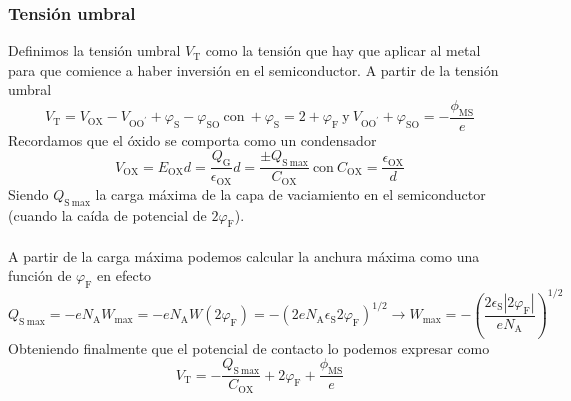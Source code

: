 \subsubsection{Tensión umbral}
Definimos la tensión umbral $V_\mathrm{T}$ como la tensión que hay que aplicar al metal para que comience a haber inversión en el semiconductor. A partir de la tensión umbral 
\begin{equation}
    V_\mathrm{T}=V_\mathrm{OX}-V_\mathrm{OO^\prime} +\varphi_\mathrm{S}-\varphi_\mathrm{SO}  \ \text{con} \ +\varphi_\mathrm{S}=2+\varphi_\mathrm{F}  \ \text{y} \ V_\mathrm{OO^\prime}+\varphi_\mathrm{SO}=-\frac{\phi_\mathrm{MS}}{e} \label{eq: potencial de contacto definicion}
\end{equation}
Recordamos que el óxido se comporta como un condensador 
\begin{equation}
V_\mathrm{OX}=E_\mathrm{OX}d=\frac{Q_\mathrm{G}}{\epsilon_\mathrm{OX}}d=\frac{\pm Q_\mathrm{S \ max}}{C_\mathrm{OX}} \ \text{con} \ C_\mathrm{OX}=\frac{\epsilon_\mathrm{OX}}{d}\label{eq: capacidad y potencial del oxido}
\end{equation}
Siendo $Q_\mathrm{S \ max}$ la carga máxima de la capa de vaciamiento en el semiconductor (cuando la caída de potencial de $2\varphi_\mathrm{F}$).\\\\
A partir de la carga máxima podemos calcular la anchura máxima como una función de $\varphi_\mathrm{F}$ en efecto 
\begin{equation}
    Q_\mathrm{S \ max}=-eN_\mathrm{A} W_\mathrm{max}= -eN_\mathrm{A} W(2\varphi_\mathrm{F})=-(2eN_\mathrm{A}\epsilon_\mathrm{S} 2\varphi_\mathrm{F})^{1/2} \xrightarrow{}  \boxed{W_\mathrm{max}=-\left( \frac{2\epsilon_\mathrm{S}|2\varphi_\mathrm{F}|}{eN_\mathrm{A}} \right)^{1/2}} \label{eq: anchura maxima}
\end{equation}
Obteniendo finalmente que el potencial de contacto lo podemos expresar como \begin{equation}
    V_\mathrm{T}=-\frac{ Q_\mathrm{S \ max}}{ C_\mathrm{OX}}+2\varphi_\mathrm{F}+\frac{\phi_\mathrm{MS}}{e}
    \label{eq: Potencial de contacto capacida oxido}
\end{equation}
